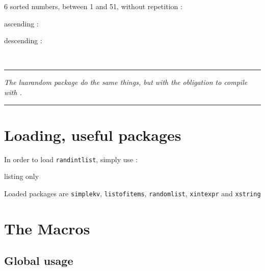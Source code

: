 \documentclass[11pt,a4paper]{ltxdoc}
\begin{document}
\begin{tcolorbox}[colframe=lightgray,colback=lightgray!5]
6 sorted numbers, between 1 and 51, without repetition :

\hfill\randintlist[min=1,max=51,nb=6,sort=asc]{\mylist}ascending : \textcolor{red}{\mylist}\hfill~

\hfill\randintlist[min=1,max=51,nb=6,sort=des,sep=>]{\mylist}descending : \textcolor{red}{\mylist}\hfill~
\end{tcolorbox}

\vfill~

\hrule

\medskip

\emph{%
	The \textsf{luarandom} package do the same things, but with the obligation to compile with .
}

\medskip

\hrule

\vspace*{5mm}

\pagebreak


\hypertarget{matoc}{}

\tableofcontents

\vspace*{5mm}


\pagebreak

\section{Loading, useful packages}

In order to load \texttt{randintlist}, simply use :

\begin{DemoCode}{listing only}
\usepackage{randintlist}
\end{DemoCode}

Loaded packages are \texttt{simplekv}, \texttt{listofitems}, \texttt{randomlist},  \texttt{xintexpr} and \texttt{xstring}

\section{The Macros}

\subsection{Global usage}
\end{document}

